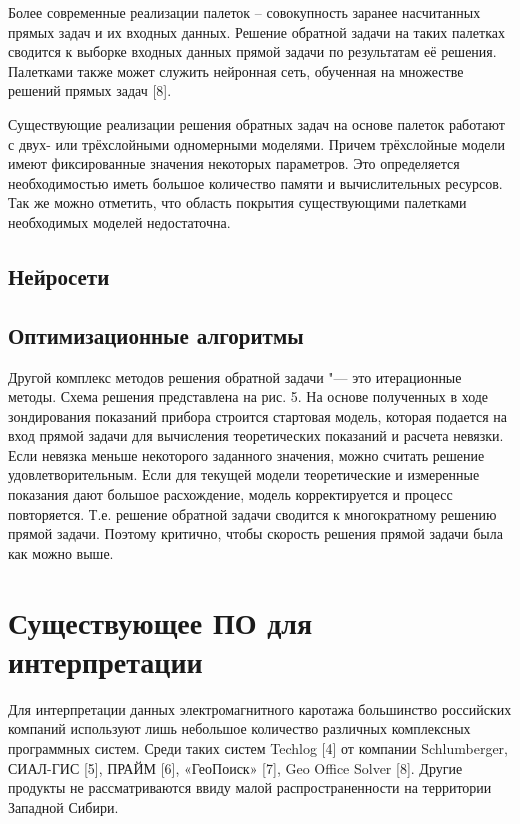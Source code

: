 Более современные реализации палеток – совокупность заранее насчитанных
прямых задач и их входных данных. Решение обратной задачи на таких палетках
сводится к выборке входных данных прямой задачи по результатам её решения.
Палетками также может служить нейронная сеть, обученная на множестве
решений прямых задач [8].

Существующие реализации решения обратных задач на основе палеток работают с
двух- или трёхслойными одномерными моделями. Причем трёхслойные модели
имеют фиксированные значения некоторых параметров. Это определяется
необходимостью иметь большое количество памяти и вычислительных ресурсов.
Так же можно отметить, что область покрытия существующими палетками
необходимых моделей недостаточна.

\subsection{Нейросети} \label{subsect1_1_3}

\subsection{Оптимизационные алгоритмы} \label{subsect1_1_4}

Другой комплекс методов решения обратной задачи "--- это итерационные
методы. Схема решения  представлена на рис. 5. На основе полученных в ходе
зондирования показаний прибора строится стартовая модель, которая подается
на вход прямой задачи для вычисления теоретических показаний и расчета
невязки. Если невязка меньше некоторого заданного значения, можно считать
решение удовлетворительным. Если для текущей модели теоретические и
измеренные показания дают большое расхождение, модель корректируется и
процесс повторяется. Т.е. решение обратной задачи сводится к многократному
решению прямой задачи. Поэтому критично, чтобы скорость решения прямой
задачи была как можно выше.


\section{Существующее ПО для интерпретации} \label{sect1_2}

Для интерпретации данных электромагнитного каротажа большинство российских
компаний используют лишь небольшое количество различных комплексных
программных систем. Среди таких систем Techlog [4] от компании
Schlumberger, СИАЛ-ГИС [5], ПРАЙМ [6], «ГеоПоиск» [7], Geo Office Solver
[8]. Другие продукты не рассматриваются ввиду малой распространенности на
территории Западной Сибири.


